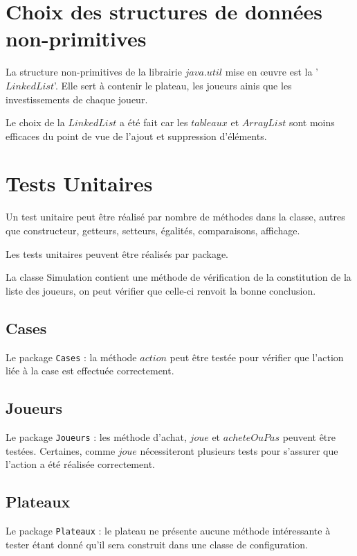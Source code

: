 \documentclass[11pt, a4paper]{report}
\begin{document}
	
	\chapter{Choix des structures de données non-primitives}
	
	La structure non-primitives de la librairie $java.util$ mise en œuvre est la '$LinkedList$'. Elle sert à contenir le plateau, les joueurs ainis que les investissements de chaque joueur.
	
	Le choix de la $LinkedList$ a été fait car les $tableaux$ et $ArrayList$ sont moins efficaces du point de vue de l'ajout et suppression d'éléments.
	
	
	\chapter{Tests Unitaires}
	
	Un test unitaire peut être réalisé par nombre de méthodes dans la classe, autres que constructeur, getteurs, setteurs, égalités, comparaisons, affichage.
	
	Les tests unitaires peuvent être réalisés par package.
	
	La classe Simulation contient une méthode de vérification de la constitution de la liste des joueurs, on peut vérifier que celle-ci renvoit la bonne conclusion.
	
	\section{Cases}
	
	Le package \verb|Cases| : la méthode $action$ peut être testée pour vérifier que l'action liée à la case est effectuée correctement.
	
	\section{Joueurs}
	
	Le package \verb|Joueurs| : les méthode d'achat, $joue$ et $acheteOuPas$ peuvent être testées. Certaines, comme $joue$ nécessiteront plusieurs tests pour s'assurer que l'action a été réalisée correctement.
	
	\section{Plateaux}
	
	Le package \verb|Plateaux| : le plateau ne présente aucune méthode intéressante à tester étant donné qu'il sera construit dans une classe de configuration.
	
\end{document}
